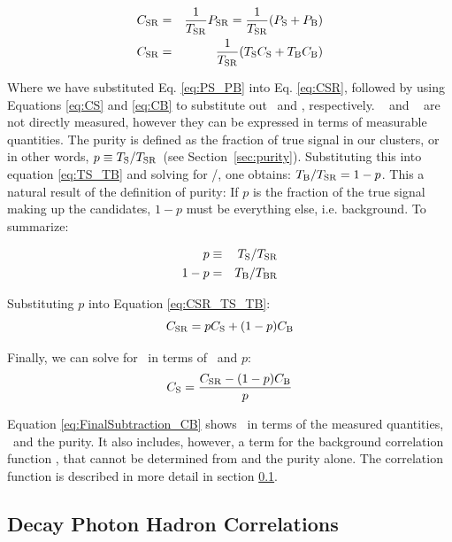 \begin{eqnarray}
\label{eq:31}
C_{\mathrm{SR}} &=& \frac{1}{T_{\mathrm{SR}}}P_{\mathrm{SR}} = \frac{1}{T_{\mathrm{SR}}}(P_{\mathrm{S}} + P_{\mathrm{B}})\\
C_{\mathrm{SR}} &=& \frac{1}{T_{\mathrm{SR}}}(T_{\mathrm{S}}C_{\mathrm{S}} +T_{\mathrm{B}}C_{\mathrm{B}})\label{eq:CSR_TS_TB}
\end{eqnarray}

Where we have substituted Eq. \ref{eq:PS_PB} into  Eq. \ref{eq:CSR}, followed by using Equations \ref{eq:CS} and \ref{eq:CB} to substitute out \PS~and \PB, respectively. \TS~ and \TB~ are not directly measured, however they can be expressed in terms of measurable quantities. The purity is defined as the fraction of true signal in our \gammaiso clusters, or in other words, $p \equiv T_{\mathrm{S}}/T_{\mathrm{SR}}$~(see Section~\ref{sec:purity}). Substituting this into equation \ref{eq:TS_TB} and solving for \TB/\TSR, one obtains: $T_{\mathrm{B}}/T_{\mathrm{SR}} = 1-p$. This a natural result of the definition of purity: If $p$ is the fraction of the true signal making up the \gammaiso candidates, $1-p$ must be everything else, i.e. background. To summarize:

\begin{eqnarray}
	p &\equiv & T_{\mathrm{S}}/T_{\mathrm{SR}}\\
	1-p &=& T_{\mathrm{B}}/T_{\mathrm{BR}}
\end{eqnarray}


Substituting $p$ into Equation \ref{eq:CSR_TS_TB}:
\begin{equation}
	C_{\mathrm{SR}} = pC_{\mathrm{S}}+ (1-p)C_{\mathrm{B}} \label{eq:CSR_CS}
\end{equation}

Finally, we can solve for \CS~in terms of \CSR~and $p$:
\begin{equation}
C_{\mathrm{S}} = \frac{C_{\mathrm{SR}} - (1-p) C_{\mathrm{B}}}{p}
\label{eq:FinalSubtraction_CB}
\end{equation}


Equation \ref{eq:FinalSubtraction_CB} shows \CS~in terms of the measured quantities, \CSR~and the purity. It also includes, however, a term for the background correlation function \CB, that cannot be determined from \CSR and the purity alone. The correlation function \CB is described in more detail in section \ref{sec:cb}.

\subsection{Decay Photon Hadron Correlations}
\label{sec:cb}

